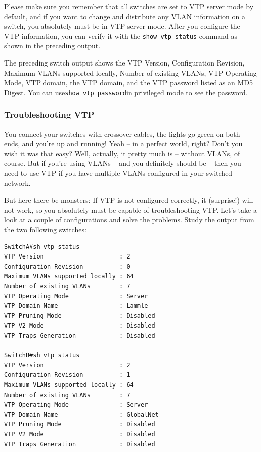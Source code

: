 \documentclass[b5paper,11pt]{memoir}
\begin{document}
Please make sure you remember that all switches are set to VTP server
mode by default, and if you want to change and distribute any VLAN
information on a switch, you absolutely must be in VTP server mode.
After you configure the VTP information, you can verify it with the
\texttt{show\ vtp\ status} command as shown in the preceding output.

The preceding switch output shows the VTP Version, Configuration
Revision, Maximum VLANs supported locally, Number of existing VLANs, VTP
Operating Mode, VTP domain, the VTP domain, and the VTP password listed
as an MD5 Digest. You can use\texttt{show\ vtp\ password}in privileged
mode to see the password.

\subsubsection[Troubleshooting
VTP]{\texorpdfstring{\protect\hypertarget{c15.xhtmlux5cux23c15-sec-8}{}{}Troubleshooting
VTP}{Troubleshooting VTP}}

You connect your switches with crossover cables, the lights go green on
both ends, and you're up and running! Yeah -- in a perfect world, right?
Don't you wish it was that easy? Well, actually, it pretty much
is -- without VLANs, of course. But if you're using VLANs -- and you
definitely should be -- then you need to use VTP if you have multiple
VLANs configured in your switched network.

But here there be monsters: If VTP is not configured correctly, it
(surprise!) will not work, so you absolutely must be capable of
troubleshooting VTP. Let's take a look at a couple of configurations and
solve the problems. Study the output from the two following switches:

\begin{verbatim}
SwitchA#sh vtp status
VTP Version                     : 2
Configuration Revision          : 0
Maximum VLANs supported locally : 64
Number of existing VLANs        : 7
VTP Operating Mode              : Server
VTP Domain Name                 : Lammle
VTP Pruning Mode                : Disabled
VTP V2 Mode                     : Disabled
VTP Traps Generation            : Disabled
 
SwitchB#sh vtp status
VTP Version                     : 2
Configuration Revision          : 1
Maximum VLANs supported locally : 64
Number of existing VLANs        : 7
VTP Operating Mode              : Server
VTP Domain Name                 : GlobalNet
VTP Pruning Mode                : Disabled
VTP V2 Mode                     : Disabled
VTP Traps Generation            : Disabled
\end{verbatim}
\end{document}
